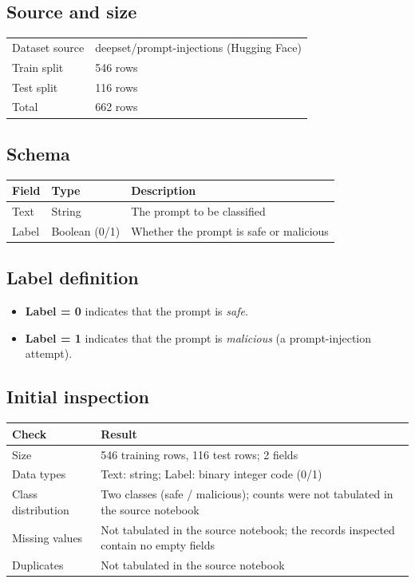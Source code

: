 \documentclass[11pt,a4paper]{article}
\newcommand{\hdr}[1]{\textbf{#1}}
\begin{document}
\subsection{Source and size}
\begin{tabularx}{\textwidth}{@{}L{4cm}X@{}}
\toprule
Dataset source & deepset/prompt-injections (Hugging Face)\\
Train split & 546 rows\\
Test split & 116 rows\\
Total & 662 rows\\
\bottomrule
\end{tabularx}

\subsection{Schema}
\begin{tabularx}{\textwidth}{@{}L{3cm}L{3.5cm}X@{}}
\toprule
{}\hdr{Field} & \hdr{Type} & \hdr{Description}\\
\midrule
Text & String & The prompt to be classified\\
Label & Boolean (0/1) & Whether the prompt is safe or malicious\\
\bottomrule
\end{tabularx}

\subsection{Label definition}
\begin{itemize}
\item \textbf{Label = 0} indicates that the prompt is \emph{safe}.
\item \textbf{Label = 1} indicates that the prompt is \emph{malicious} (a prompt-injection attempt).
\end{itemize}

\subsection{Initial inspection}
\begin{tabularx}{\textwidth}{@{}L{4cm}X@{}}
\toprule
{}\hdr{Check} & \hdr{Result}\\
\midrule
Size & 546 training rows, 116 test rows; 2 fields\\
Data types & Text: string; Label: binary integer code (0/1)\\
Class distribution & Two classes (safe / malicious); counts were not tabulated in the source notebook\\
Missing values & Not tabulated in the source notebook; the records inspected contain no empty fields\\
Duplicates & Not tabulated in the source notebook\\
\bottomrule
\end{tabularx}
\end{document}
